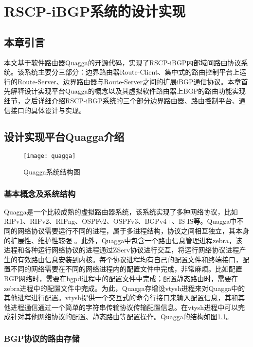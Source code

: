 \chapter{RSCP-iBGP系统的设计实现}
\label{cha:design}

\section{本章引言}
本文基于软件路由器Quagga\cite{quagga}的开源代码，实现了RSCP-iBGP内部域间路由协议系统。该系统主要分三部分：边界路由器Route-Client、集中式的路由控制平台上运行的Route-Server、边界路由器与Route-Server之间的扩展iBGP通信协议。本章首先解释设计实现平台Quagga的概念以及其虚拟软件路由器上BGP的路由功能实现细节，之后详细介绍RSCP-iBGP系统的三个部分边界路由器、路由控制平台、通信接口的具体设计与实现。

\section{设计实现平台Quagga介绍}

\begin{figure}
  \centering
  \texttt{[image: quagga]}
  \caption{Quagga系统结构图\cite{jakma2014quagga}}
  \label{fig:quagga}
\end{figure}


\subsection{基本概念及系统结构}
Quagga是一个比较成熟的虚拟路由器系统，该系统实现了多种网络协议，比如RIPv1、RIPv2、RIPng、OSPFv2、OSPFv3、BGPv4+、IS-IS等。Quagga中不同的网络协议需要运行不同的进程，属于多进程结构，协议之间相互独立，其本身的扩展性、维护性较强 \cite{quaggaThesis}。此外，Quagga中包含一个路由信息管理进程zebra，该进程和各种运行网络协议的进程通过ZServ协议进行交互，将运行网络协议进程产生的有效路由信息安装到内核\cite{jakma2014quagga}。每个协议进程均有自己的配置文件和终端接口，配置不同的网络需要在不同的网络进程内的配置文件中完成，非常麻烦。比如配置BGP网络时，需要在bgpd进程中的配置文件中完成；配置静态路由时，需要在zebra进程中的配置文件中完成。为此，Quagga存增设vtysh进程来对Quagga中的其他进程进行配置。vtysh提供一个交互式的命令行接口来输入配置信息，其和其他进程通信通过一个简单的字符串传输协议传输配置信息。在vtysh进程中可以完成针对其他网络协议的配置、静态路由等配置操作。Quagga的结构如图\ref{fig:quagga}。
\subsection{BGP协议的路由存储}

